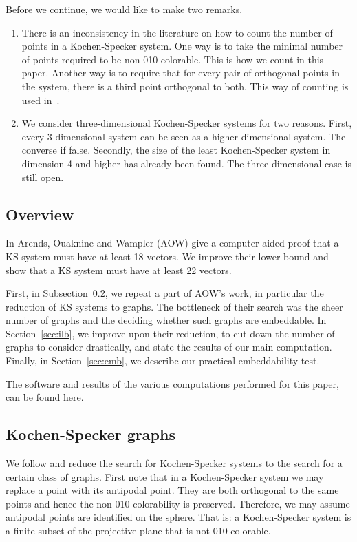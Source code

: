 \documentclass{report}
\begin{document}
Before we continue, we would like to make two remarks.
\begin{enumerate}
\item
There is an inconsistency in the literature on how to count the number
of points in a Kochen-Specker system.  One way is to take the minimal
number of points required to be non-010-colorable.
This is how we count in this paper.
Another way is to require that for every pair of orthogonal points
in the system, there is a third point orthogonal to both.
This way of counting is used in~\cite{pavivcic}.
\item
We consider three-dimensional Kochen-Specker systems
for two reasons.
First, every 3-dimensional system can be seen as a higher-dimensional
            system.   The converse if false.
Secondly, the size of the least Kochen-Specker system
            in dimension 4 and higher has already been found.\cite{pavivcic}
            The three-dimensional case is still open.
\end{enumerate}

\subsection{Overview}
In \cite{aow11} Arends, Ouaknine and Wampler (AOW) give a computer aided proof
that a KS system must have at least 18 vectors.  We improve their lower bound
and show that a KS system must have at least 22 vectors.

First, in Subsection~\ref{sec:ksgraphs},
we repeat a part of AOW's work, in particular the reduction of
KS systems to graphs.
The bottleneck of their search was the sheer number of graphs
and the deciding whether such graphs are embeddable.
In Section~\ref{sec:ilb},
we improve upon their reduction,
to cut down the number of graphs to consider drastically,
and state the results of our main computation.
Finally, in Section~\ref{sec:emb},
we describe our practical embeddability test.

The software and results of the various computations performed for
this paper, can be found here\cite{GH}.

\subsection{Kochen-Specker graphs}
\label{sec:ksgraphs}
We follow \cite{aow11} and reduce the search for Kochen-Specker systems
to the search for a certain class of graphs.
First note that in a Kochen-Specker system we may replace a point with its
antipodal point.  They are both orthogonal to the same points and hence
the non-010-colorability is preserved.
Therefore, we may assume antipodal points are identified on the sphere.
That is: a Kochen-Specker system is a finite subset of the projective plane
that is not 010-colorable.
\end{document}
